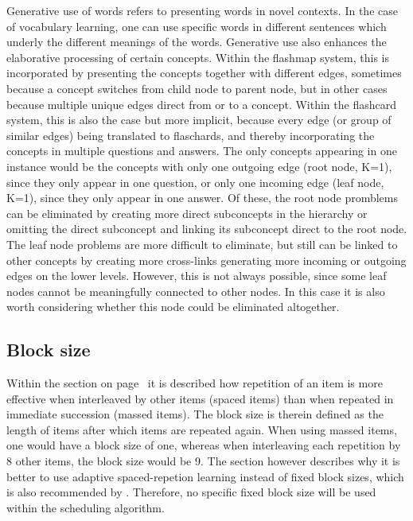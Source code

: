 Generative use of words refers to presenting words in novel contexts. In the case of vocabulary learning, one can use specific words in different sentences which underly the different meanings of the words. Generative use also enhances the elaborative processing of certain concepts. Within the flashmap system, this is incorporated by presenting the concepts together with different edges, sometimes because a concept switches from child node to parent node, but in other cases because multiple unique edges direct from or to a concept. Within the flashcard system, this is also the case but more implicit, because every edge (or group of similar edges) being translated to flaschards, and thereby incorporating the concepts in multiple questions and answers. The only concepts appearing in one instance would be the concepts with only one outgoing edge (root node, K=1), since they only appear in one question, or only one incoming edge (leaf node, K=1), since they only appear in one answer. Of these, the root node promblems can be eliminated by creating more direct subconcepts in the hierarchy or omitting the direct subconcept and linking its subconcept direct to the root node. The leaf node problems are more difficult to eliminate, but still can be linked to other concepts by creating more cross-links generating more incoming or outgoing edges on the lower levels. However, this is not always possible, since some leaf nodes cannot be meaningfully connected to other nodes. In this case it is also worth considering whether this node could be eliminated altogether.

        \subsection{Block size}

Within the  section on page~\pageref{subsec:spacingeffect} it is described how repetition of an item is more effective when interleaved by other items (spaced items) than when repeated in immediate succession (massed items). The block size is therein defined as the length of items after which items are repeated again. When using massed items, one would have a block size of one, whereas when interleaving each repetition by 8 other items, the block size would be 9. The  section however describes why it is better to use adaptive spaced-repetion learning instead of fixed block sizes, which is also recommended by . Therefore, no specific fixed block size will be used within the scheduling algorithm.
        
